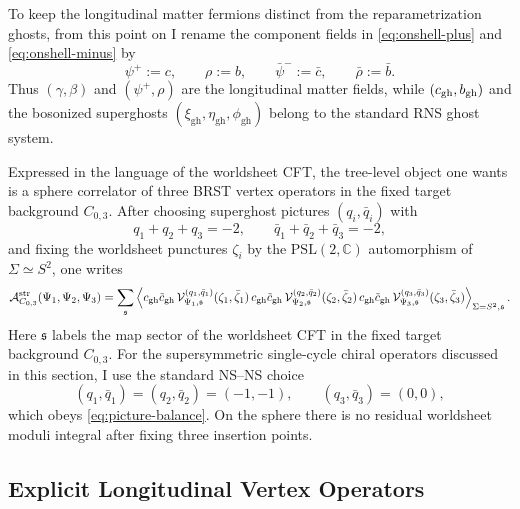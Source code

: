 \documentclass[11pt]{article}
\newcommand{\mc}[1]{\mathcal{#1}}
\newcommand{\bC}{\mathbb{C}}
\newcommand{\gh}{\mathrm{gh}}
\begin{document}
To keep the longitudinal matter fermions distinct from the reparametrization ghosts, from this point on I rename the component fields in \eqref{eq:onshell-plus} and \eqref{eq:onshell-minus} by
\begin{equation}\label{eq:longitudinal-fermion-rename}
\psi^+:=c,
\qquad
\rho:=b,
\qquad
\bar\psi^-:=\bar c,
\qquad
\bar\rho:=\bar b.
\end{equation}
Thus $(\gamma,\beta)$ and $(\psi^+,\rho)$ are the longitudinal matter fields, while $(c_{\rm gh},b_{\rm gh})$ and the bosonized superghosts $(\xi_{\gh},\eta_{\gh},\phi_{\gh})$ belong to the standard RNS ghost system.

Expressed in the language of the worldsheet CFT, the tree-level object one wants is a sphere correlator of three BRST vertex operators in the fixed target background $C_{0,3}$. After choosing superghost pictures $(q_i,\bar q_i)$ with
\begin{equation}\label{eq:picture-balance}
q_1+q_2+q_3=-2,
\qquad
\bar q_1+\bar q_2+\bar q_3=-2,
\end{equation}
and fixing the worldsheet punctures $\zeta_i$ by the $\mathrm{PSL}(2,\bC)$ automorphism of $\Sigma\simeq S^2$, one writes
\begin{equation}\label{eq:pair-of-pants-cft-correlator}
\mc A^{\rm str}_{C_{0,3}}(\Psi_1,\Psi_2,\Psi_3)
=
\sum_{\mathfrak s}
\left\langle
c_{\rm gh}\tilde c_{\rm gh}\,\mc V_{\Psi_1,\mathfrak s}^{(q_1,\bar q_1)}(\zeta_1,\bar\zeta_1)\,
c_{\rm gh}\tilde c_{\rm gh}\,\mc V_{\Psi_2,\mathfrak s}^{(q_2,\bar q_2)}(\zeta_2,\bar\zeta_2)\,
c_{\rm gh}\tilde c_{\rm gh}\,\mc V_{\Psi_3,\mathfrak s}^{(q_3,\bar q_3)}(\zeta_3,\bar\zeta_3)
\right\rangle_{\Sigma=S^2,\mathfrak s}.
\end{equation}
Here $\mathfrak s$ labels the map sector of the worldsheet CFT in the fixed target background $C_{0,3}$. For the supersymmetric single-cycle chiral operators discussed in this section, I use the standard NS--NS choice
\begin{equation}\label{eq:sphere-picture-choice}
(q_1,\bar q_1)=(q_2,\bar q_2)=(-1,-1),
\qquad
(q_3,\bar q_3)=(0,0),
\end{equation}
which obeys \eqref{eq:picture-balance}. On the sphere there is no residual worldsheet moduli integral after fixing three insertion points.

\subsection{Explicit Longitudinal Vertex Operators}
\end{document}
